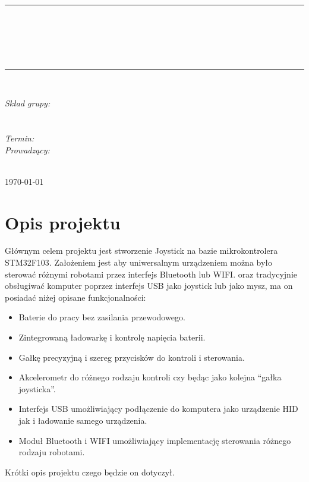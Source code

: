 \documentclass[10pt, a4paper]{article}
\begin{document}
\def\tablename{Tabela}	%

\begin{titlepage}
	\begin{center}
		\textsc{\LARGE \formakursu}\\[1cm]		
		\textsc{\Large \kurs}\\[0.5cm]		
		\rule{\textwidth}{0.08cm}\\[0.4cm]
		{\huge \bfseries \doctype}\\[1cm]
		{\huge \bfseries \projectname}\\[0.5cm]
		{\huge \bfseries \acronim}\\[0.4cm]
		\rule{\textwidth}{0.08cm}\\[1cm]
		
		\begin{flushright} \large
		\emph{Skład grupy:}\\
		\osobaA\\
		\osobaB\\[0.4cm]
		
		\emph{Termin: }\termin\\[0.4cm]

		\emph{Prowadzący:} \\
		\prowadzacy \\
		
		\end{flushright}
		
		\vfill
		
		{\large \today}
	\end{center}	
\end{titlepage}

\newpage
\tableofcontents
\newpage

\section{Opis projektu}
\label{sec:OpisProjektu}

Głównym celem projektu jest stworzenie Joystick na bazie mikrokontrolera STM32F103. Założeniem jest aby uniwersalnym urządzeniem można było sterować różnymi robotami przez interfejs Bluetooth lub WIFI. oraz tradycyjnie obsługiwać komputer poprzez interfejs USB jako joystick lub jako mysz, ma on posiadać niżej opisane funkcjonalności:
\begin{itemize}
	\item Baterie do pracy bez zasilania przewodowego.
	\item Zintegrowaną ładowarkę i kontrolę napięcia baterii.
	\item Gałkę precyzyjną i  szereg przycisków do kontroli i sterowania.
	\item Akcelerometr do różnego rodzaju kontroli czy będąc jako kolejna “gałka joysticka”.
	\item Interfejs USB umożliwiający podłączenie do komputera jako urządzenie HID jak i ładowanie samego urządzenia.
	\item Moduł Bluetooth i WIFI umożliwiający implementację sterowania różnego rodzaju robotami.
\end{itemize}
Krótki opis projektu czego będzie on dotyczył.
\end{document}
